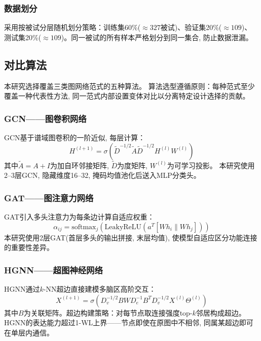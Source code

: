 \documentclass[12pt,a4paper,heading=true,fontset=windows]{ctexart}
\newcommand{\kw}[1]{{\heiti #1}}
\begin{document}
\subsubsection{数据划分}

采用\kw{按被试分层随机划分}策略：训练集60\%($\approx 327$被试)、验证集20\%($\approx 109$)、
测试集20\%($\approx 109$)。同一被试的所有样本严格划分到同一集合, 防止数据泄漏。

\subsection{对比算法}

本研究选择覆盖\kw{三类图网络范式}的五种算法。
算法选型遵循原则：每种范式至少覆盖一种代表性方法,
同一范式内部设置变体对比以分离特定设计选择的贡献。

\subsubsection{GCN——图卷积网络}

GCN\cite{kipf2017gcn}基于谱域图卷积的一阶近似, 每层计算：
\begin{equation}
    H^{(l+1)} = \sigma\left(\tilde{D}^{-1/2} \tilde{A} \tilde{D}^{-1/2} H^{(l)} W^{(l)}\right)
\end{equation}
其中$\tilde{A} = A + I$为加自环邻接矩阵, $\tilde{D}$为度矩阵, $W^{(l)}$为可学习投影。
本研究使用2--3层GCN, 隐藏维度16--32, 掩码均值池化后送入MLP分类头。

\subsubsection{GAT——图注意力网络}

GAT\cite{velickovic2018gat}引入多头注意力为每条边计算自适应权重：
\begin{equation}
    \alpha_{ij} = \text{softmax}_j\left(\text{LeakyReLU}\left(a^T [W h_i \| W h_j]\right)\right)
\end{equation}
本研究使用2层GAT(首层多头的输出拼接, 末层均值), 使模型自适应区分功能连接的重要性差异。

\subsubsection{HGNN——超图神经网络}

HGNN\cite{feng2019hgnn}通过$k$-NN超边直接建模多脑区高阶交互：
\begin{equation}
    X^{(l+1)} = \sigma\left(D_v^{-1/2} B W D_e^{-1} B^T D_v^{-1/2} X^{(l)} \Theta^{(l)}\right)
\end{equation}
其中$B$为关联矩阵。超边构建策略：对每节点取连接强度top-$k$邻居构成超边。
HGNN的表达能力超过1-WL上界——节点即使在原图中不相邻, 同属某超边即可在单层内通信。
\end{document}
